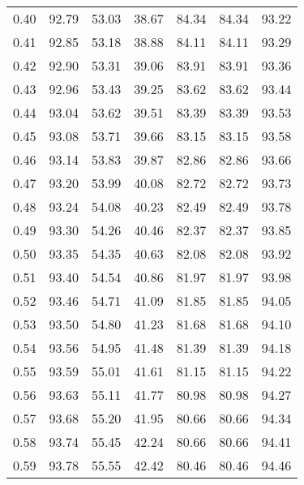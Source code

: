 \begin{tabular}{|c|c|c|c|c|c|c|}
      0.40 &     92.79 &     53.03 &      38.67 &   84.34 &      84.34 &         93.22 \\
      0.41 &     92.85 &     53.18 &      38.88 &   84.11 &      84.11 &         93.29 \\
      0.42 &     92.90 &     53.31 &      39.06 &   83.91 &      83.91 &         93.36 \\
      0.43 &     92.96 &     53.43 &      39.25 &   83.62 &      83.62 &         93.44 \\
      0.44 &     93.04 &     53.62 &      39.51 &   83.39 &      83.39 &         93.53 \\
      0.45 &     93.08 &     53.71 &      39.66 &   83.15 &      83.15 &         93.58 \\
      0.46 &     93.14 &     53.83 &      39.87 &   82.86 &      82.86 &         93.66 \\
      0.47 &     93.20 &     53.99 &      40.08 &   82.72 &      82.72 &         93.73 \\
      0.48 &     93.24 &     54.08 &      40.23 &   82.49 &      82.49 &         93.78 \\
      0.49 &     93.30 &     54.26 &      40.46 &   82.37 &      82.37 &         93.85 \\
      0.50 &     93.35 &     54.35 &      40.63 &   82.08 &      82.08 &         93.92 \\
      0.51 &     93.40 &     54.54 &      40.86 &   81.97 &      81.97 &         93.98 \\
      0.52 &     93.46 &     54.71 &      41.09 &   81.85 &      81.85 &         94.05 \\
      0.53 &     93.50 &     54.80 &      41.23 &   81.68 &      81.68 &         94.10 \\
      0.54 &     93.56 &     54.95 &      41.48 &   81.39 &      81.39 &         94.18 \\
      0.55 &     93.59 &     55.01 &      41.61 &   81.15 &      81.15 &         94.22 \\
      0.56 &     93.63 &     55.11 &      41.77 &   80.98 &      80.98 &         94.27 \\
      0.57 &     93.68 &     55.20 &      41.95 &   80.66 &      80.66 &         94.34 \\
      0.58 &     93.74 &     55.45 &      42.24 &   80.66 &      80.66 &         94.41 \\
      0.59 &     93.78 &     55.55 &      42.42 &   80.46 &      80.46 &         94.46 \\

\end{tabular}
